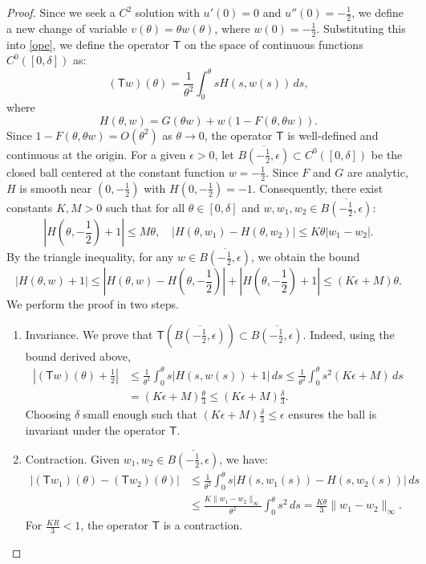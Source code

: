\documentclass[10pt,a4paper]{amsart}
\begin{document}
\begin{proof}
 
Since we seek a $C^2$ solution with $u'(0)=0$ and $u''(0)=-\frac12$, we define a new change of variable $v(\theta) = \theta w(\theta)$, where $w(0)=-\frac12$. Substituting this into \eqref{ope}, we define the operator $\mathsf{T}$ on the space of continuous functions $C^0([0, \delta])$ as:
\begin{equation*}
 (\mathsf{T}w)(\theta) = \frac{1}{\theta^2} \int_0^\theta s H(s, w(s)) \, ds,
\end{equation*}
where 
$$H(\theta, w) = G(\theta w) + w(1 - F(\theta, \theta w)).$$
Since $1 - F(\theta, \theta w) = O(\theta^2)$ as $\theta \to 0$, the operator $\mathsf{T}$ is well-defined and continuous at the origin.  For a given $\epsilon > 0$, let $\overline{B(-\frac12, \epsilon)} \subset C^0([0, \delta])$ be the closed ball centered at the constant function $w =- \frac12$. Since $F$ and $G$ are analytic, $H$ is smooth near $(0, -\frac12)$ with $H(0, -\frac12) = -1$. Consequently, there exist constants $K, M > 0$ such that for all $\theta \in [0, \delta]$ and $w, w_1, w_2 \in \overline{B(-\frac12, \epsilon)}$:
$$
|H(\theta, -\frac12) +1| \leq M\theta, \quad |H(\theta, w_1) - H(\theta, w_2)| \leq K \theta |w_1 - w_2|.
$$
By the triangle inequality, for any $w \in \overline{B(-\frac12, \epsilon)}$, we obtain the bound 
$$|H(\theta, w) +1| \leq |H(\theta, w) - H(\theta, -\frac12)| + |H(\theta, -\frac12) +1| \leq (K\epsilon + M)\theta.$$
 We perform the proof in two steps.

\begin{enumerate}
 \item Invariance. We prove that $\mathsf{T}(\overline{B(-\frac12, \epsilon)}) \subset \overline{B(-\frac12, \epsilon)}$. Indeed, using the bound derived above,
 \begin{equation*}
 \begin{split}
 |(\mathsf{T}w)(\theta) +\frac12| &\leq \frac{1}{\theta^2} \int_0^\theta s |H(s, w(s)) +1| \, ds \leq \frac{1}{\theta^2} \int_0^\theta s^2 (K\epsilon + M) \, ds \\
 &= (K\epsilon + M)\frac{\theta}{3} \leq (K\epsilon + M)\frac{\delta}{3}.
 \end{split}
 \end{equation*}
 Choosing $\delta$ small enough such that  $(K\epsilon + M)\frac{\delta}{3} \leq \epsilon$ ensures the ball is invariant under the operator $\mathsf{T}$.
 
 \item Contraction.   Given $w_1, w_2 \in \overline{B(-\frac12, \epsilon)}$, we have:
 \begin{equation*}
 \begin{split}
 |(\mathsf{T}w_1)(\theta) - (\mathsf{T}w_2)(\theta)| &\leq \frac{1}{\theta^2} \int_0^\theta s |H(s, w_1(s)) - H(s, w_2(s))| \, ds \\
 &\leq \frac{K \|w_1 - w_2\|_\infty}{\theta^2} \int_0^\theta s^2 \, ds = \frac{K \theta}{3} \|w_1 - w_2\|_\infty.
 \end{split}
 \end{equation*}
 For $\frac{K R}{3} < 1$, the operator $\mathsf{T}$ is a contraction.
\end{enumerate}
 

\end{proof}
\end{document}
